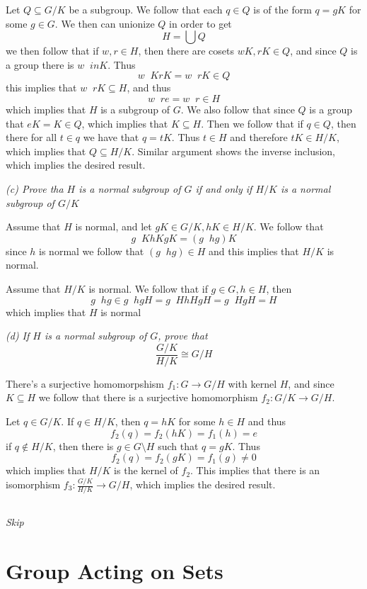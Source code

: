 \documentclass[11pt,oneside,titlepage]{book}
\DeclareMathOperator \inv {^{-1}}
\begin{document}
Let $Q \subseteq G/K$ be a subgroup. We follow that each $q \in Q$ is
of the form $q = gK$ for some $g \in G$.  We then can unionize $Q$ in
order to get
$$H = \bigcup Q$$
we then follow that if $w, r \in H$, then there are cosets $wK, rK \in
Q$, and since $Q$ is a group there is $w\inv in K$.  Thus
$$w\inv K r K = w\inv r K \in Q$$
this implies that $w\inv r K \subseteq H$, and thus
$$w\inv r e = w\inv r \in H$$
which implies that $H$ is a subgroup of $G$. We also follow that since
$Q$ is a group that $eK = K \in Q$, which implies that $K \subseteq
H$. Then we follow that if $q \in Q$, then there for all $t \in q$ we
have that $q = tK$. Thus $t \in H$ and therefore $tK \in H/K$, which
implies that $Q \subseteq H/K$. Similar argument shows the inverse
inclusion, which implies the desired result.

\textit{(c) Prove tha $H$ is a normal subgroup of $G$ if and only if
  $H/K$ is a normal subgroup of $G/K$}

Assume that $H$ is normal, and let $gK \in G/K, hK \in H/K$. We follow that
$$g\inv K h K g K = (g\inv h g) K$$
since $h$ is normal we follow that $(g\inv h g) \in H$ and this implies that
$H/K$ is normal.

Assume that $H/K$ is normal. We follow that if $g \in G, h \in H$, then
$$g\inv h g \in g\inv h g H = g\inv H h H g H = g\inv H g H = H$$
which implies that $H$ is normal

\textit{(d) If $H$ is a normal subgroup of $G$, prove that
  $$\frac{G/K}{H/K} \cong G/H$$}

There's a surjective homomorpshism $f_1: G \to G/H$ with kernel $H$, and
since $K \subseteq H$ we follow that there is a surjective
homomorphism $f_2: G/K \to G/H$.

Let $q \in G/K$.  If $q \in H/K$, then $q = hK$ for some $h \in H$ and thus
$$f_2(q) = f_2(hK) = f_1(h) = e$$
if $q \notin H/K$, then there is $g \in G \setminus H$ such that $q = gK$. Thus
$$f_2(q) = f_2(gK) = f_1(g) \neq 0$$
which implies that $H/K$ is the kernel of $f_2$. This implies that
there is an isomorphism $f_3: \frac{G/K}{H/K} \to G/H$, which implies
the desired result.

\subsection{}

\textit{Skip}

\section{Group Acting on Sets}
\end{document}

